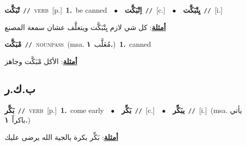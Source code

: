 \documentclass[10pt,a4paper,twoside]{article} %
\begin{document}
\begin{multicols}{2}
{\setlength\topsep{0pt}\textbf{\foreignlanguage{arabic}{تْبَكَّت}}\ {\color{gray}\texttt{//}\color{black}}\ \textsc{verb}\ [p.]\ \textbf{1.}~be canned\ \ $\bullet$\ \ \setlength\topsep{0pt}\textbf{\foreignlanguage{arabic}{اِتْبَكَّت}}\ {\color{gray}\texttt{//}\color{black}}\ [c.]\ \ $\bullet$\ \ \setlength\topsep{0pt}\textbf{\foreignlanguage{arabic}{يِتْبَكَّت}}\ {\color{gray}\texttt{//}\color{black}}\ [i.]\  \begin{flushright}\color{gray}\foreignlanguage{arabic}{\textbf{\underline{\foreignlanguage{arabic}{أمثلة}}}: كل شي لازم يِتْبَكَّت ويتغلَّف عشان سمعة المصنع}\end{flushright}\color{black}} \vspace{2mm}

{\setlength\topsep{0pt}\textbf{\foreignlanguage{arabic}{مْبَكَّت}}\ {\color{gray}\texttt{//}\color{black}}\ \textsc{noun\textunderscore pass}\ \color{gray}(msa. \foreignlanguage{arabic}{مُعَلَّب}~\foreignlanguage{arabic}{\textbf{١.}})\color{black}\ \textbf{1.}~canned\  \begin{flushright}\color{gray}\foreignlanguage{arabic}{\textbf{\underline{\foreignlanguage{arabic}{أمثلة}}}: الأكل مْبَكَّت وجاهز}\end{flushright}\color{black}} \vspace{2mm}

\vspace{-3mm}
\subsection*{\color{blue}\foreignlanguage{arabic}{ب.ك.ر}\color{blue}{}} 

{\setlength\topsep{0pt}\textbf{\foreignlanguage{arabic}{بَكَّر}}\ {\color{gray}\texttt{//}\color{black}}\ \textsc{verb}\ [p.]\ \textbf{1.}~come early\ \ $\bullet$\ \ \setlength\topsep{0pt}\textbf{\foreignlanguage{arabic}{بَكِّر}}\ {\color{gray}\texttt{//}\color{black}}\ [c.]\ \ $\bullet$\ \ \setlength\topsep{0pt}\textbf{\foreignlanguage{arabic}{يبَكِّر}}\ {\color{gray}\texttt{//}\color{black}}\ [i.]\ \color{gray}(msa. \foreignlanguage{arabic}{يأتي باكراً}~\foreignlanguage{arabic}{\textbf{١.}})\color{black}\  \begin{flushright}\color{gray}\foreignlanguage{arabic}{\textbf{\underline{\foreignlanguage{arabic}{أمثلة}}}: بَكِّر بكرة بالجية الله يرضى عليك}\end{flushright}\color{black}} \vspace{2mm}


\end{multicols}
\end{document}
